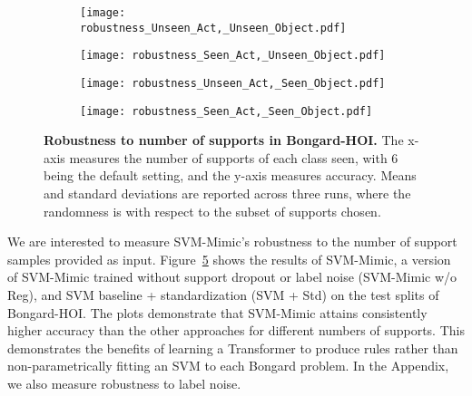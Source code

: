 \begin{figure}
  \centering
  
\begin{subfigure}{0.49\columnwidth}
    \centering
    \texttt{[image: robustness\_Unseen\_Act,\_Unseen\_Object.pdf]}
    \label{fig:sub1}
  \end{subfigure}
  \hfill
  \begin{subfigure}{0.49\columnwidth}
    \centering
    \texttt{[image: robustness\_Seen\_Act,\_Unseen\_Object.pdf]}
    \label{fig:sub2}
  \end{subfigure}
  
\begin{subfigure}{0.49\columnwidth}
    \centering
    \texttt{[image: robustness\_Unseen\_Act,\_Seen\_Object.pdf]}
    \label{fig:sub3}
  \end{subfigure}
  \hfill
  \begin{subfigure}{0.49\columnwidth}
    \centering
    \texttt{[image: robustness\_Seen\_Act,\_Seen\_Object.pdf]}
    \label{fig:sub4}
  \end{subfigure}
  
  \caption{\textbf{Robustness to number of supports in Bongard-HOI.} The x-axis measures the number of supports of each class seen, with 6 being the default setting, and the y-axis measures accuracy. Means and standard deviations are reported across three runs, where the randomness is with respect to the subset of supports chosen.}
  \label{fig:robustness}

\end{figure}

We are interested to measure SVM-Mimic's robustness to the number of support samples provided as input. 
Figure~\ref{fig:robustness} shows the results of SVM-Mimic, a version of SVM-Mimic trained without support dropout or label noise (SVM-Mimic w/o Reg), and SVM baseline + standardization (SVM + Std) on the test splits of Bongard-HOI. The plots demonstrate that SVM-Mimic attains consistently higher accuracy than the other approaches for different numbers of supports.
This demonstrates the benefits of learning a Transformer to produce rules rather than non-parametrically fitting an SVM to each Bongard problem. In the Appendix, we also measure robustness to label noise.

